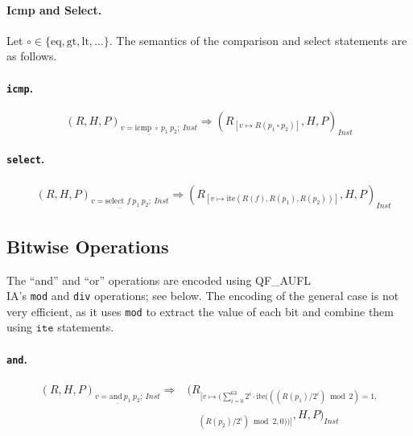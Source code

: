 \paragraph{Icmp and Select.}
Let $\circ \in \{\text{eq}, \text{gt}, \text{lt}, \dots\}$. The semantics of the comparison and select statements are as follows.
\paragraph{\texttt{icmp}.}
\[
(R,H,P)_{\underline{v = \text{icmp}\ \circ\ p_1\ p_2};\ \mathit{Inst}} \Rightarrow 
(R_{[v\mapsto R(p_1 \circ p_2)]},H,P)_\mathit{Inst}
\]
\paragraph{\texttt{select}.}
\[
\begin{aligned}
&(R,H,P)_{\underline{v = \text{select } f\ p_1\ p_2};\ \mathit{Inst}} \Rightarrow 
(R_{[v\mapsto \text{ite}(R(f),R(p_1),R(p_2))]},H,P)_\mathit{Inst}
\end{aligned}
\]

\subsection{Bitwise Operations}
The ``and'' and ``or'' operations are encoded using QF\_AUFL\\IA's \texttt{mod} and \texttt{div} operations; see below. The encoding of the general case is not very efficient, as it uses \texttt{mod} to extract the value of each bit and combine them using $\texttt{ite}$ statements.


\paragraph{\texttt{and}.}
\[
\begin{aligned}
(R,H,P)_{\underline{v = \text{and}\ p_1\ p_2};\ \mathit{Inst}} \Rightarrow &
(R_{[v\mapsto ( \sum_{i=0}^{63} 2^i \cdot \text{ite}(((R(p_1)/2^i)\bmod2) =1,}\\
&\quad_{(R(p_2)/2^i)\bmod2, 0))]},H,P)_\mathit{Inst}
\end{aligned}
\]

